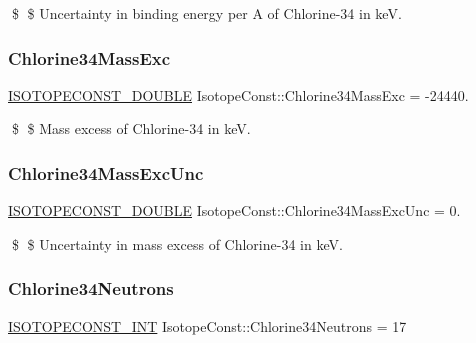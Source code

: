 \$ \$ Uncertainty in binding energy per A of Chlorine-\/34 in keV. \mbox{\label{group___isotope_const-_chlorine-_cl34_gac5acefb462a86f8e1b77e4895d041127}} 
\subsubsection{\texorpdfstring{Chlorine34\+Mass\+Exc}{Chlorine34MassExc}}
{\footnotesize\ttfamily \mbox{\hyperlink{group___isotope_const-_macros_ga8f45a7272ce02c0b4c65c44636ed719a}{I\+S\+O\+T\+O\+P\+E\+C\+O\+N\+S\+T\+\_\+\+D\+O\+U\+B\+LE}} Isotope\+Const\+::\+Chlorine34\+Mass\+Exc = -\/24440.}

\$ \$ Mass excess of Chlorine-\/34 in keV. \mbox{\label{group___isotope_const-_chlorine-_cl34_ga370d3b26a4955e7f2a227b21a498bc29}} 
\subsubsection{\texorpdfstring{Chlorine34\+Mass\+Exc\+Unc}{Chlorine34MassExcUnc}}
{\footnotesize\ttfamily \mbox{\hyperlink{group___isotope_const-_macros_ga8f45a7272ce02c0b4c65c44636ed719a}{I\+S\+O\+T\+O\+P\+E\+C\+O\+N\+S\+T\+\_\+\+D\+O\+U\+B\+LE}} Isotope\+Const\+::\+Chlorine34\+Mass\+Exc\+Unc = 0.}

\$ \$ Uncertainty in mass excess of Chlorine-\/34 in keV. \mbox{\label{group___isotope_const-_chlorine-_cl34_ga1c13d043e616904e8e4c4ec695f2358b}} 
\subsubsection{\texorpdfstring{Chlorine34\+Neutrons}{Chlorine34Neutrons}}
{\footnotesize\ttfamily \mbox{\hyperlink{group___isotope_const-_macros_ga5f18360b3e99483a35c32d789e62621c}{I\+S\+O\+T\+O\+P\+E\+C\+O\+N\+S\+T\+\_\+\+I\+NT}} Isotope\+Const\+::\+Chlorine34\+Neutrons = 17}

